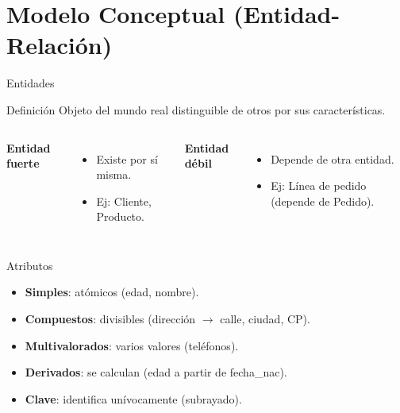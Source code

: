 \documentclass[aspectratio=169, 10pt, xcolor=table]{beamer}
\begin{document}
\section{Modelo Conceptual (Entidad-Relación)}

\begin{frame}{Entidades}
    \begin{block}{Definición}
        Objeto del mundo real distinguible de otros por sus características.
    \end{block}
    \begin{columns}[t]
        \textbf{Entidad fuerte}
        \begin{itemize}
            \item Existe por sí misma.
            \item Ej: Cliente, Producto.
        \end{itemize}
        \textbf{Entidad débil}
        \begin{itemize}
            \item Depende de otra entidad.
            \item Ej: Línea de pedido (depende de Pedido).
        \end{itemize}
    \end{columns}
\end{frame}

\begin{frame}{Atributos}
    \begin{itemize}
        \item \textbf{Simples}: atómicos (edad, nombre).
        \item \textbf{Compuestos}: divisibles (dirección $\rightarrow$ calle, ciudad, CP).
        \item \textbf{Multivalorados}: varios valores (teléfonos).
        \item \textbf{Derivados}: se calculan (edad a partir de fecha\_nac).
        \item \textbf{Clave}: identifica unívocamente (subrayado).
    \end{itemize}
    \centering
\end{frame}
\end{document}
